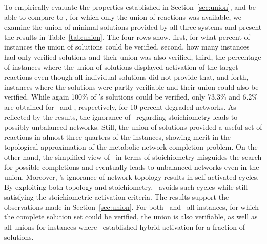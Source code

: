 To empirically evaluate the properties established in Section~\ref{sec:union},
and be able to compare to \gapfill, for which only the union of reactions was available,
we examine the union of minimal solutions provided by all three systems
and present the results in Table~\ref{tab:union}.
The four rows show,
first, for what percent of instances the union of solutions could be verified,
second, how many instances had only verified solutions and their union was also verified,
third, the percentage of instances where the union of solutions displayed activation of the target reactions even though all individual solutions did not provide that,
and forth, instances where the solutions were partly verifiable and their union could also be verified.
While again 100\% of \fluto's solutions could be verified, only 73.3\% and 6.2\% are obtained for \meneco\ and \gapfill, respectively, for 10 percent degraded networks.
As reflected by the results, the ignorance of \meneco\ regarding stoichiometry leads to possibly unbalanced networks.
Still, the union of solutions provided a useful set of reactions in almost three quarters of the instances, showing merit in the topological approximation of the metabolic network completion problem.
On the other hand, the simplified view of \gapfill\ in terms of stoichiometry misguides the search for possible completions and eventually leads to unbalanced networks even in the union.
Moreover, \gapfill's ignorance of network topology results in self-activated cycles.
By exploiting both topology and stoichiometry,
\fluto\ avoids such cycles while still satisfying the stoichiometric activation criteria.
The results support the observations made in Section~\ref{sec:union}.
For both \fluto\ and \meneco\, all instances, for which the complete solution set could be verified,
the union is also verifiable,
as well as all unions for instances where \meneco\ established hybrid activation for a fraction of solutions.



